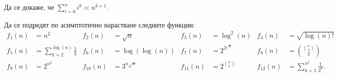 \begin{problem}
Да се докаже, че $\sum\limits_{i = 0}^n i^k \asymp n^{k+1}$.
\end{problem}

\begin{problem}
Да се подредят по асимптотично нарастване следните функции:
\begin{align*}
  f_1(n) & = n^2                                       & f_2(n)    & = \sqrt{n}       & f_3(n)    & = \log^2(n)        & f_4(n)    & = \sqrt{\log(n)!}                          \\
  f_5(n) & = \sum\limits_{k = 2}^{\log(n)} \frac{1}{k} & f_6(n)    & = \log(\log(n))  & f_7(n)    & = 2^{2^{\sqrt{n}}} & f_8(n)    & = \binom{\binom{n}{3}}{2}                  \\
  f_9(n) & =2^{n^2}                                    & f_{10}(n) & = 3^{n \sqrt{n}} & f_{11}(n) & =2^{\binom{n}{2}}  & f_{12}(n) & = \sum\limits_{k = 1}^{n^2} \frac{1}{2^k}.
\end{align*}
\end{problem}